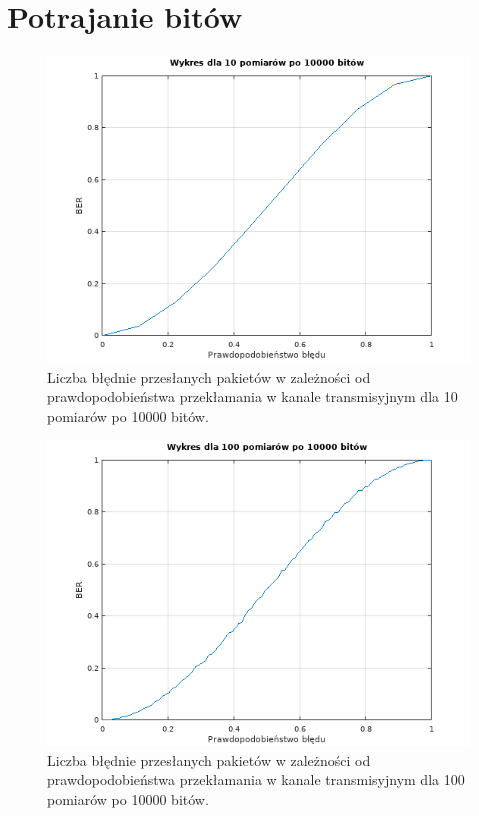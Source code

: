 \documentclass[12pt,a4paper,notitlepage]{report}
\begin{document}
    \section{Potrajanie bitów}
    \begin{figure}[H]
        \centering       
        \includegraphics[width=\textwidth]{10_po_10000.png}
        \caption{Liczba błędnie przesłanych pakietów w zależności od prawdopodobieństwa przekłamania w kanale transmisyjnym dla 10 pomiarów po 10000 bitów.}
        \label{fig:obrazek 10_po_10000}
    \end{figure}
    \begin{figure}[H]
        \centering       
        \includegraphics[width=\textwidth]{100_po_10000.png}
        \caption{Liczba błędnie przesłanych pakietów w zależności od prawdopodobieństwa przekłamania w kanale transmisyjnym dla 100 pomiarów po 10000 bitów.}
        \label{fig:obrazek 100_po_10000}
    \end{figure}
\end{document}
